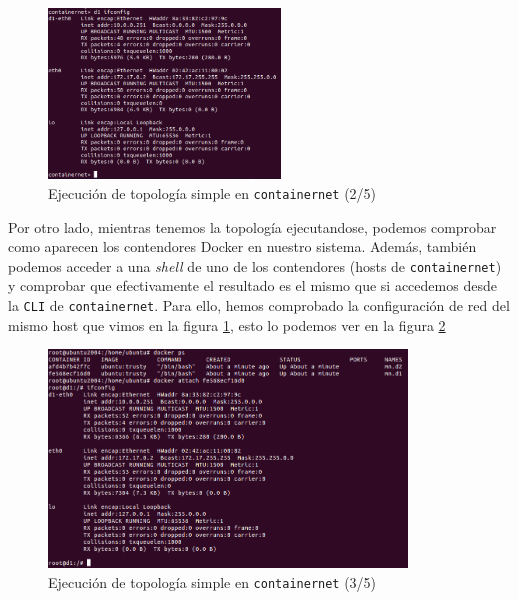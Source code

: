 \documentclass[a4paper, oneside, 12pt]{book}
\begin{document}
	\pagebreak

	\begin{figure}[h!]
		\begin{center}
			\includegraphics[width=0.55\textwidth]{img/cn_example2.png}
			\caption{Ejecución de topología simple en \texttt{containernet} (2/5)}
			\label{img: cn simple 2}
		\end{center}
	\end{figure}

	\noindent Por otro lado, mientras tenemos la topología ejecutandose, podemos comprobar como aparecen los contendores Docker en nuestro sistema. Además, también podemos acceder a una \textit{shell} de uno de los contendores (hosts de \texttt{containernet}) y comprobar que efectivamente el resultado es el mismo que si accedemos desde la \texttt{CLI} de \texttt{containernet}. Para ello, hemos comprobado la configuración de red del mismo host que vimos en la figura \ref{img: cn simple 2}, esto lo podemos ver en la figura \ref{img: cn simple 3}

	\begin{figure}[h!]
		\begin{center}
			\includegraphics[width=0.85\textwidth]{img/cn_example3.png}
			\caption{Ejecución de topología simple en \texttt{containernet} (3/5)}
			\label{img: cn simple 3}
		\end{center}
	\end{figure}
\end{document}
